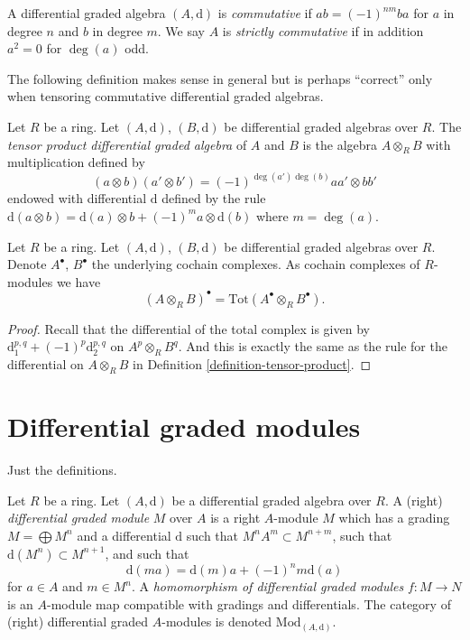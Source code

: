 \begin{definition}
\label{definition-cdga}
A differential graded algebra $(A, \text{d})$ is {\it commutative} if
$ab = (-1)^{nm}ba$ for $a$ in degree $n$ and $b$ in degree $m$.
We say $A$ is {\it strictly commutative} if in addition $a^2 = 0$
for $\deg(a)$ odd.
\end{definition}

\noindent
The following definition makes sense in general but is perhaps
``correct'' only when tensoring commutative differential graded
algebras.

\begin{definition}
\label{definition-tensor-product}
Let $R$ be a ring.
Let $(A, \text{d})$, $(B, \text{d})$ be differential graded algebras over $R$.
The {\it tensor product differential graded algebra} of $A$ and $B$
is the algebra $A \otimes_R B$ with multiplication defined by
$$
(a \otimes b)(a' \otimes b') = (-1)^{\deg(a')\deg(b)} aa' \otimes bb'
$$
endowed with differential $\text{d}$ defined by the rule
$\text{d}(a \otimes b) = \text{d}(a) \otimes b + (-1)^m a \otimes \text{d}(b)$
where $m = \deg(a)$.
\end{definition}

\begin{lemma}
\label{lemma-total-complex-tensor-product}
Let $R$ be a ring.
Let $(A, \text{d})$, $(B, \text{d})$ be differential graded algebras over $R$.
Denote $A^\bullet$, $B^\bullet$ the underlying cochain complexes.
As cochain complexes of $R$-modules we have
$$
(A \otimes_R B)^\bullet = \text{Tot}(A^\bullet \otimes_R B^\bullet).
$$
\end{lemma}

\begin{proof}
Recall that the differential of the total complex is given by
$\text{d}_1^{p, q} + (-1)^p \text{d}_2^{p, q}$ on $A^p \otimes_R B^q$.
And this is exactly the same as the rule for the differential
on $A \otimes_R B$ in
Definition \ref{definition-tensor-product}.
\end{proof}






\section{Differential graded modules}
\label{section-modules}

\noindent
Just the definitions.

\begin{definition}
\label{definition-dgm}
Let $R$ be a ring.
Let $(A, \text{d})$ be a differential graded algebra over $R$.
A (right) {\it differential graded module} $M$ over $A$ is a right $A$-module
$M$ which has a grading $M = \bigoplus M^n$ and a differential $\text{d}$
such that $M^n A^m \subset M^{n + m}$, such that
$\text{d}(M^n) \subset M^{n + 1}$, and such that
$$
\text{d}(ma) = \text{d}(m)a + (-1)^n m\text{d}(a)
$$
for $a \in A$ and $m \in M^n$. A
{\it homomorphism of differential graded modules} $f : M \to N$
is an $A$-module map compatible with gradings and differentials.
The category of (right) differential graded $A$-modules is denoted
$\text{Mod}_{(A, \text{d})}$.
\end{definition}

